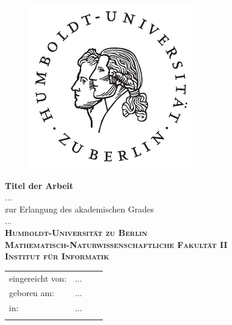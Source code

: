 \begin{titlepage}
\hspace{20cm}
\vspace{-2cm}

\begin{figure}[H] \hspace{11cm}
\includegraphics[width=3.2 cm]{picture/husiegel}
\end{figure}

\begin{center}
  \vspace{0.5 cm}
  \huge{\bf Titel der Arbeit} \\ %
  \vspace{1.5cm}
  \LARGE  ... \\ %
  \vspace{1cm}
  \Large zur Erlangung des akademischen Grades \\
  ... \\ %
  \vspace{2cm}
  {\large
    \bf{
      \scshape
      Humboldt-Universit\"at zu Berlin \\
      Mathematisch-Naturwissenschaftliche Fakult\"at II \\
      Institut f\"ur Informatik\\
    }
  } 
\end{center}
\vspace{5 cm}
{\large
  \begin{tabular}{llll}
    eingereicht von:    & ... && \\ %
    geboren am:         & ... && \\
    in:                 & ... && \\
    &&&\\

\end{tabular}}
\end{titlepage}
